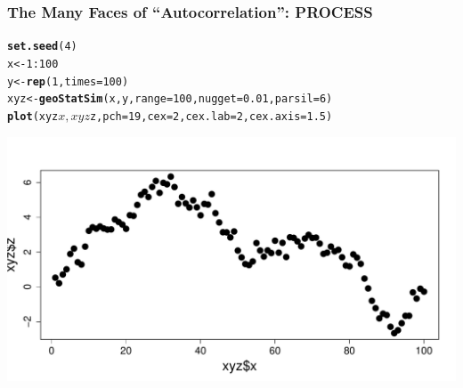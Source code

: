 \documentclass[mathserif,compress]{beamer}\usepackage{graphicx, color}
\makeatletter
\newcommand{\hlfunctioncall}[1]{\textcolor[rgb]{0.501960784313725,0,0.329411764705882}{\textbf{#1}}}%
\newenvironment{kframe}{%
 \def\at@end@of@kframe{}%
 \ifinner\ifhmode%
  \def\at@end@of@kframe{\end{minipage}}%
  \begin{minipage}{\columnwidth}%
 \fi\fi%
 \def\FrameCommand##1{\hskip\@totalleftmargin \hskip-\fboxsep
 \colorbox{shadecolor}{##1}\hskip-\fboxsep
     \hskip-\linewidth \hskip-\@totalleftmargin \hskip\columnwidth}%
 \MakeFramed {\advance\hsize-\width
   \@totalleftmargin\z@ \linewidth\hsize
   \@setminipage}}%
 {\par\unskip\endMakeFramed%
 \at@end@of@kframe}
\newenvironment{knitrout}{}{} %
\makeatother
\begin{document}
\begin{frame} [fragile]
\frametitle{The Many Faces of ``Autocorrelation'': PROCESS}
     
\begin{knitrout}\tiny
{}\color{fgcolor}\begin{kframe}
\begin{alltt}
\hlfunctioncall{set.seed}(4)
x <- 1:100
y <- \hlfunctioncall{rep}(1, times = 100)
xyz <- \hlfunctioncall{geoStatSim}(x, y, range = 100, nugget = 0.01, parsil = 6)
\hlfunctioncall{plot}(xyz$x, xyz$z, pch = 19, cex = 2, cex.lab = 2, cex.axis = 1.5)
\end{alltt}
\end{kframe}

{\centering \includegraphics[width=.7\linewidth]{figure/AutoCor-ProcessFig} 

}



\end{knitrout}

\end{frame}
\end{document}
